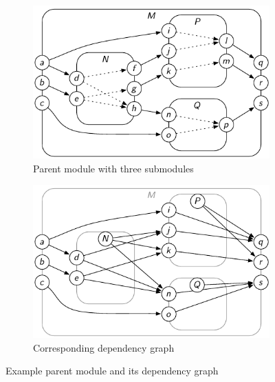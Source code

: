 \documentclass[paper=letter,fontsize=11pt,captions=tableheading]{scrartcl}
\numberwithin{equation}{section}
\theoremstyle{algorithm}
\theoremstyle{plain}
\theoremstyle{nonumberplain}
\begin{document}
\begin{figure}[htb]
	\centering
	\begin{subfigure}{8.2cm}
		\includegraphics{compute-resume-state}
		\caption{Parent module with three submodules\label{fig:compute-resume-state-orig}}
	\end{subfigure}
	\quad
	\begin{subfigure}{8.2cm}
		\includegraphics{compute-resume-state-dg}
		\caption{Corresponding dependency graph\label{fig:compute-resume-state-dg}}
	\end{subfigure}
	\caption{Example parent module and its dependency graph\label{fig:compute-resume-state}}
\end{figure}
\end{document}
